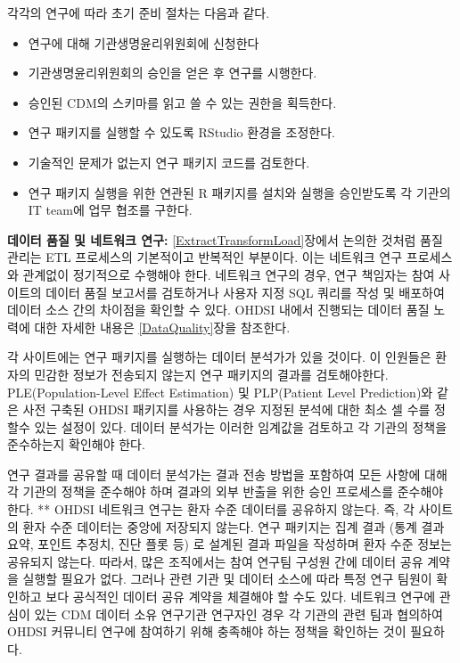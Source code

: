 \documentclass[11pt]{book}
\providecommand{\tightlist}{%
  \setlength{\itemsep}{0pt}\setlength{\parskip}{0pt}}
\theoremstyle{definition}
\theoremstyle{definition}
\theoremstyle{definition}
\theoremstyle{remark}
\let\BeginKnitrBlock\begin \let\EndKnitrBlock\end
\begin{document}
각각의 연구에 따라 초기 준비 절차는 다음과 같다.

\begin{itemize}
\tightlist
\item
  연구에 대해 기관생명윤리위원회에 신청한다
\item
  기관생명윤리위원회의 승인을 얻은 후 연구를 시행한다.
\item
  승인된 CDM의 스키마를 읽고 쓸 수 있는 권한을 획득한다.
\item
  연구 패키지를 실행할 수 있도록 RStudio 환경을 조정한다.
\item
  기술적인 문제가 없는지 연구 패키지 코드를 검토한다.
\item
  연구 패키지 실행을 위한 연관된 R 패키지를 설치와 실행을 승인받도록 각
  기관의 IT team에 업무 협조를 구한다.
\end{itemize}

\BeginKnitrBlock{rmdimportant}
\textbf{데이터 품질 및 네트워크 연구:} \ref{ExtractTransformLoad}장에서
논의한 것처럼 품질 관리는 ETL 프로세스의 기본적이고 반복적인 부분이다.
이는 네트워크 연구 프로세스와 관계없이 정기적으로 수행해야 한다.
네트워크 연구의 경우, 연구 책임자는 참여 사이트의 데이터 품질 보고서를
검토하거나 사용자 지정 SQL 쿼리를 작성 및 배포하여 데이터 소스 간의
차이점을 확인할 수 있다. OHDSI 내에서 진행되는 데이터 품질 노력에 대한
자세한 내용은 \ref{DataQuality}장을 참조한다.
\EndKnitrBlock{rmdimportant}

각 사이트에는 연구 패키지를 실행하는 데이터 분석가가 있을 것이다. 이
인원들은 환자의 민감한 정보가 전송되지 않는지 연구 패키지의 결과를
검토해야한다. PLE(Population-Level Effect Estimation) 및 PLP(Patient
Level Prediction)와 같은 사전 구축된 OHDSI 패키지를 사용하는 경우 지정된
분석에 대한 최소 셀 수를 정할수 있는 설정이 있다. 데이터 분석가는 이러한
임계값을 검토하고 각 기관의 정책을 준수하는지 확인해야 한다.

연구 결과를 공유할 때 데이터 분석가는 결과 전송 방법을 포함하여 모든
사항에 대해 각 기관의 정책을 준수해야 하며 결과의 외부 반출을 위한 승인
프로세스를 준수해야 한다. ** OHDSI 네트워크 연구는 환자 수준 데이터를
공유하지 않는다. 즉, 각 사이트의 환자 수준 데이터는 중앙에 저장되지
않는다. 연구 패키지는 집계 결과 (통계 결과 요약, 포인트 추정치, 진단
플롯 등) 로 설계된 결과 파일을 작성하며 환자 수준 정보는 공유되지
않는다. 따라서, 많은 조직에서는 참여 연구팀 구성원 간에 데이터 공유
계약을 실행할 필요가 없다. 그러나 관련 기관 및 데이터 소스에 따라 특정
연구 팀원이 확인하고 보다 공식적인 데이터 공유 계약을 체결해야 할 수도
있다. 네트워크 연구에 관심이 있는 CDM 데이터 소유 연구기관 연구자인 경우
각 기관의 관련 팀과 협의하여 OHDSI 커뮤니티 연구에 참여하기 위해
충족해야 하는 정책을 확인하는 것이 필요하다.
\end{document}
